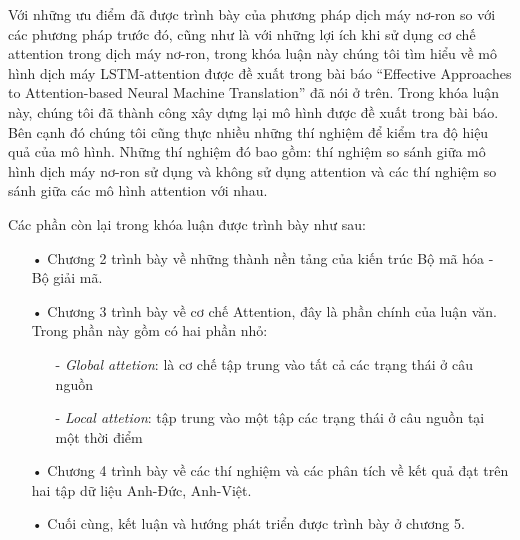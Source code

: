 

Với những ưu điểm đã được trình bày của phương pháp dịch máy nơ-ron so với các phương pháp trước đó, cũng như là với những lợi ích khi sử dụng cơ chế attention trong dịch máy nơ-ron, trong khóa luận này chúng tôi tìm hiểu về mô hình dịch máy LSTM-attention được đề xuất trong bài báo “Effective Approaches to Attention-based Neural Machine Translation” \cite{attentionThangLuong2015} đã nói ở trên. Trong khóa luận này, chúng tôi đã thành công xây dựng lại mô hình được đề xuất trong bài báo. Bên cạnh đó chúng tôi cũng thực nhiều những thí nghiệm để kiểm tra độ hiệu quả của mô hình. Những thí nghiệm đó bao gồm: thí nghiệm so sánh giữa mô hình dịch máy nơ-ron sử dụng và không sử dụng attention và các thí nghiệm so sánh giữa các mô hình attention với nhau.

Các phần còn lại trong khóa luận được trình bày như sau:
\begin{itemize}
	\item[•] Chương 2 trình bày về những thành nền tảng của kiến trúc Bộ mã hóa - Bộ giải mã.
	
	\item[•] Chương 3 trình bày về cơ chế Attention, đây là phần chính của luận văn. Trong phần này gồm có hai phần nhỏ:
		\begin{itemize}
			\item[-] \textit{Global attetion}: là cơ chế tập trung vào tất cả các trạng thái ở câu nguồn
			\item[-] \textit{Local attetion}: tập trung vào một tập các trạng thái ở câu nguồn tại một thời điểm
		\end{itemize}
	\item[•] Chương 4 trình bày về các thí nghiệm và các phân tích về kết quả đạt trên hai tập dữ liệu Anh-Đức, Anh-Việt.
	\item[•] Cuối cùng, kết luận và hướng phát triển được trình bày ở chương 5.
\end{itemize}





